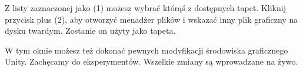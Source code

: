 Z listy zaznaczonej jako \textcolor{ubuntu_orange}{(}1\textcolor{ubuntu_orange}{)} możesz wybrać którąś z dostępnych tapet. Kliknij przycisk plus \textcolor{ubuntu_orange}{(}2\textcolor{ubuntu_orange}{)}, aby otworzyć menadżer plików i wskazać inny plik graficzny na dysku twardym. Zostanie on użyty jako tapeta.

W tym oknie możesz też dokonać pewnych modyfikacji środowiska graficznego Unity. Zachęcamy do eksperymentów. Wszelkie zmiany są wprowadzane na żywo.
